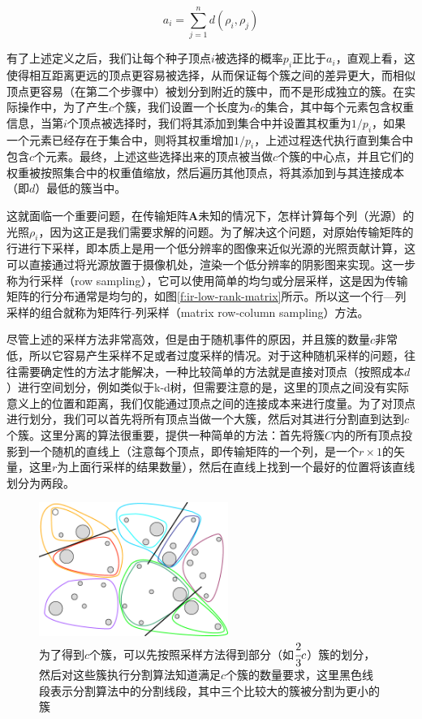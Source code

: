 \begin{equation}
	a_i=\sum^{n}_{j=1}d(\rho_i,\rho_j)
\end{equation}

有了上述定义之后，我们让每个种子顶点$i$被选择的概率$p_i$正比于$a_i$，直观上看，这使得相互距离更远的顶点更容易被选择，从而保证每个簇之间的差异更大，而相似顶点更容易（在第二个步骤中）被划分到附近的簇中，而不是形成独立的簇。在实际操作中，为了产生$c$个簇，我们设置一个长度为$c$的集合，其中每个元素包含权重信息，当第$i$个顶点被选择时，我们将其添加到集合中并设置其权重为$1/p_i$，如果一个元素已经存在于集合中，则将其权重增加$1/p_i$，上述过程迭代执行直到集合中包含$c$个元素。最终，上述这些选择出来的顶点被当做$c$个簇的中心点，并且它们的权重被按照集合中的权重值缩放，然后遍历其他顶点，将其添加到与其连接成本（即$d$）最低的簇当中。

这就面临一个重要问题，在传输矩阵$\mathbf{A}$未知的情况下，怎样计算每个列（光源）的光照$\rho_i$，因为这正是我们需要求解的问题。为了解决这个问题，\cite{a:MatrixRow-ColumnSamplingfortheMany-LightProblem}对原始传输矩阵的行进行下采样，即本质上是用一个低分辨率的图像来近似光源的光照贡献计算，这可以直接通过将光源放置于摄像机处，渲染一个低分辨率的阴影图来实现。这一步称为行采样（row sampling），它可以使用简单的均匀或分层采样，这是因为传输矩阵的行分布通常是均匀的，如图\ref{f:ir-low-rank-matrix}所示。所以这一个行—列采样的组合就称为矩阵行-列采样（matrix row-column sampling）方法。

尽管上述的采样方法非常高效，但是由于随机事件的原因，并且簇的数量$c$非常低，所以它容易产生采样不足或者过度采样的情况。对于这种随机采样的问题，往往需要确定性的方法才能解决，一种比较简单的方法就是直接对顶点（按照成本$d$）进行空间划分，例如类似于k-d树，但需要注意的是，这里的顶点之间没有实际意义上的位置和距离，我们仅能通过顶点之间的连接成本来进行度量。为了对顶点进行划分，我们可以首先将所有顶点当做一个大簇，然后对其进行分割直到达到$c$个簇。这里分离的算法很重要，\cite{a:MatrixRow-ColumnSamplingfortheMany-LightProblem}提供一种简单的方法：首先将簇$C$内的所有顶点投影到一个随机的直线上（注意每个顶点，即传输矩阵的一个列，是一个$r\times 1$的矢量，这里$r$为上面行采样的结果数量），然后在直线上找到一个最好的位置将该直线划分为两段。

\begin{figure}
	\sidecaption
	\includegraphics[width=0.55\textwidth]{figures/ir/combine-clustering}
	\caption{为了得到$c$个簇，可以先按照采样方法得到部分（如$ \cfrac{2}{3}c$）簇的划分，然后对这些簇执行分割算法知道满足$c$个簇的数量要求，这里黑色线段表示分割算法中的分割线段，其中三个比较大的簇被分割为更小的簇}
	\label{f:ir-combine-clustering}
\end{figure}

